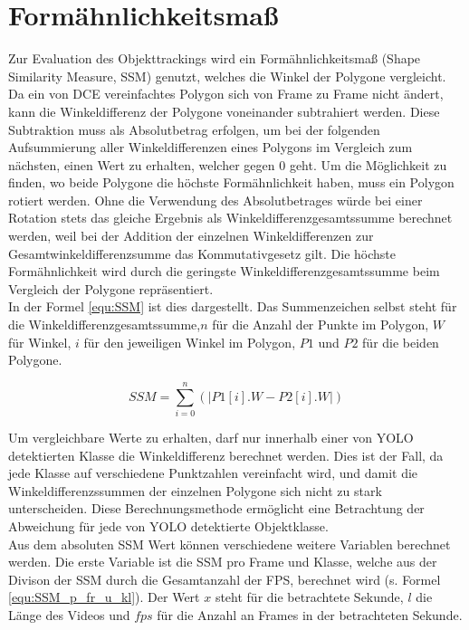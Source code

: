 \section{Formähnlichkeitsmaß }{ \label{theo:SSM}
	Zur Evaluation des Objekttrackings wird ein Formähnlichkeitsmaß (\glqq Shape Similarity Measure\grqq{}, SSM) genutzt, welches die Winkel der Polygone vergleicht. \\
	Da ein von DCE vereinfachtes Polygon sich von Frame zu Frame nicht ändert, kann die Winkeldifferenz der Polygone voneinander subtrahiert werden. Diese Subtraktion muss als Absolutbetrag erfolgen, um bei der folgenden Aufsummierung aller Winkeldifferenzen eines Polygons im Vergleich zum nächsten, einen Wert zu erhalten, welcher gegen 0 geht. Um die Möglichkeit zu finden, wo beide Polygone die höchste Formähnlichkeit haben, muss ein Polygon rotiert werden. Ohne die Verwendung des Absolutbetrages würde bei einer Rotation stets das gleiche Ergebnis als Winkeldifferenzgesamtssumme berechnet werden, weil bei der Addition der einzelnen Winkeldifferenzen zur Gesamtwinkeldifferenzsumme das Kommutativgesetz gilt. Die höchste Formähnlichkeit wird durch die geringste Winkeldifferenzgesamtssumme beim Vergleich der Polygone repräsentiert.\\
	In der Formel \ref{equ:SSM} ist dies dargestellt. Das Summenzeichen selbst steht für die Winkeldifferenzgesamtssumme,$n$ für die Anzahl der Punkte im Polygon, $W$ für Winkel, $i$ für den jeweiligen Winkel im Polygon, $P1$ und $P2$ für die beiden Polygone.

	\begin{equation} \label{equ:SSM}
		SSM = \sum_{i = 0}^{n}  (\lvert P1[i].W - P2[i].W \rvert)
	\end{equation}	

	Um vergleichbare Werte zu erhalten, darf nur innerhalb einer von YOLO detektierten Klasse die Winkeldifferenz berechnet werden. Dies ist der Fall, da jede Klasse auf verschiedene Punktzahlen vereinfacht wird, und damit die Winkeldifferenzssummen der einzelnen Polygone sich nicht zu stark unterscheiden. Diese Berechnungsmethode ermöglicht eine Betrachtung der Abweichung für jede von YOLO detektierte Objektklasse. \\
	Aus dem absoluten SSM Wert können verschiedene weitere Variablen berechnet werden. Die erste Variable ist die SSM pro Frame und Klasse, welche aus der Divison der SSM durch die Gesamtanzahl der FPS, berechnet wird (s. Formel \ref{equ:SSM_p_fr_u_kl}). Der Wert $x$ steht für die betrachtete Sekunde, $l$ die Länge des Videos und $\textit{fps}$ für die Anzahl an Frames in der betrachteten Sekunde.
 
}
